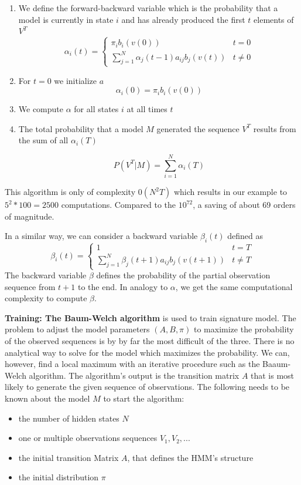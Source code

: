 \documentclass[a4paper, oneside]{csthesis}
\begin{document}
\begin{enumerate}
\item We define the forward-backward variable which is the probability that a model is currently in state $i$ and has already produced the first $t$ elements of $V^T$
$$\alpha_i(t) = \begin{cases} \pi_i b_i(v(0)) & t = 0 \\ \sum_{j=1}^N \alpha_j(t-1)a_{ij}b_j (v(t))& t \ne 0 \end{cases}$$

\item For $t=0$ we initialize $a$
$$\alpha_i(0) = \pi_i b_i (v(0))$$

\item We compute $\alpha$ for all states $i$ at all times $t$
\item The total probability that a model $M$ generated the sequence $V^T$ results from the sum of all $\alpha_i(T)$

$$P(V^T|M) = \sum\limits_{i=1}^N \alpha_i(T)$$
\end{enumerate}

This algorithm is only of complexity $\mathcal{0}(N^2T)$ which results in our example to $5^2 * 100 = 2500$ computations. Compared to the $10^72$, a saving of about 69 orders of magnitude.

In a similar way, we can consider a backward variable $\beta_i(t)$ defined as
$$\beta_i(t) = \begin{cases} 1 & t = T \\ \sum_{j=1}^N \beta_j(t+1)a_{ij}b_j (v(t+1))& t \ne T \end{cases}$$
The backward variable $\beta$ defines the probability of the partial observation sequence from $t+1$ to the end. In analogy to $\alpha$, we get the same computational complexity to compute $\beta$.


\textbf{Training: The Baum-Welch algorithm} is used to train signature model. The problem to adjust the model parameters $(A,B, \pi)$ to maximize the probability of the observed sequences is by by far the most difficult of the three. There is no analytical way to solve for the model which maximizes the probability. We can, however, find a local maximum with an iterative procedure such as the Baaum-Welch algorithm.
The algorithm's output is the transition matrix $A$ that is most likely to generate the given sequence of observations. The following needs to be known about the model $M$ to start the algorithm:
\begin{itemize}
 \item the number of hidden states $N$
 \item one or multiple observations sequences $V_1, V_2, ...$
 \item the initial transition Matrix $A$, that defines the HMM's structure
 \item the initial distribution $\pi$
\end{itemize}
\end{document}

